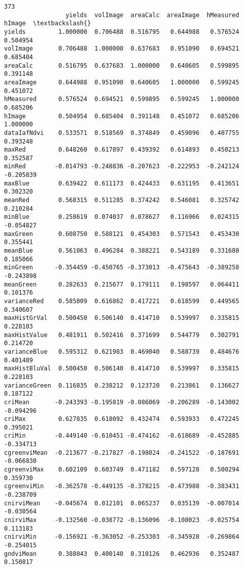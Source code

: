 \documentclass[11pt]{article}
\begin{document}
    \begin{Verbatim}[commandchars=\\\{\}]
373
                 yields  volImage  areaCalc  areaImage  hMeasured    hImage  \textbackslash{}
yields         1.000000  0.706488  0.516795   0.644988   0.576524  0.504954
volImage       0.706488  1.000000  0.637683   0.951090   0.694521  0.685404
areaCalc       0.516795  0.637683  1.000000   0.640605   0.599895  0.391148
areaImage      0.644988  0.951090  0.640605   1.000000   0.599245  0.451072
hMeasured      0.576524  0.694521  0.599895   0.599245   1.000000  0.685206
hImage         0.504954  0.685404  0.391148   0.451072   0.685206  1.000000
dataIafNdvi    0.533571  0.518569  0.374849   0.459096   0.407755  0.393248
maxRed         0.648260  0.617897  0.439392   0.614893   0.450213  0.352587
minRed        -0.014793 -0.248836 -0.207623  -0.222953  -0.242124 -0.205839
maxBlue        0.639422  0.611173  0.424433   0.631195   0.413651  0.302320
meanRed        0.568315  0.511285  0.374242   0.546081   0.325742  0.210284
minBlue        0.258619  0.074037  0.078627   0.116966   0.024315 -0.054827
maxGreen       0.608750  0.588121  0.454303   0.571543   0.453430  0.355441
meanBlue       0.561063  0.496284  0.388221   0.543189   0.331680  0.185066
minGreen      -0.354459 -0.450765 -0.373013  -0.475643  -0.389258 -0.243898
meanGreen      0.282633  0.215677  0.179111   0.198597   0.064411  0.101376
varianceRed    0.585009  0.616862  0.417221   0.618599   0.449565  0.340607
maxHistGrVal   0.500450  0.506140  0.414710   0.539997   0.335815  0.228103
maxHistValue   0.481911  0.502416  0.371699   0.544779   0.302791  0.214720
varianceBlue   0.595312  0.621983  0.469040   0.588739   0.484676  0.401489
maxHistBluVal  0.500450  0.506140  0.414710   0.539997   0.335815  0.228103
varianceGreen  0.116835  0.238212  0.123720   0.213861   0.136627  0.187122
criMean       -0.243393 -0.195819 -0.086069  -0.206289  -0.143002 -0.094296
criMax         0.627835  0.618092  0.432474   0.593933   0.472245  0.395021
criMin        -0.449140 -0.610451 -0.474162  -0.618689  -0.452885 -0.334713
cgreenviMean  -0.213677 -0.217827 -0.198024  -0.241522  -0.187691 -0.066830
cgreenviMax    0.602109  0.603749  0.471182   0.597128   0.500294  0.359730
cgreenviMin   -0.362578 -0.449135 -0.378215  -0.473988  -0.383431 -0.238709
cnirviMean    -0.045674  0.012101  0.065237   0.035139  -0.007014 -0.030564
cnirviMax     -0.132560 -0.038772 -0.136096  -0.108023  -0.025754  0.113183
cnirviMin     -0.156921 -0.363052 -0.253303  -0.345928  -0.269864 -0.254015
gndviMean      0.388043  0.400140  0.310126   0.462936   0.352487  0.150817

\end{Verbatim}
\end{document}
